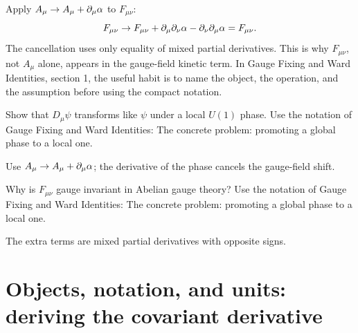 \begin{example}
Apply \(A_\mu\to A_\mu+\partial_\mu\alpha\) to \(F_{\mu\nu}\):
\[
  F_{\mu\nu}\to F_{\mu\nu}+\partial_\mu\partial_\nu\alpha-\partial_\nu\partial_\mu\alpha=F_{\mu\nu}.
\]
The cancellation uses only equality of mixed partial derivatives.  This is why \(F_{\mu\nu}\), not \(A_\mu\) alone, appears in the gauge-field kinetic term.  In Gauge Fixing and Ward Identities, section 1, the useful habit is to name the object, the operation, and the assumption before using the compact notation.
\end{example}



\begin{exercise}
Show that \(D_\mu\psi\) transforms like \(\psi\) under a local \(U(1)\) phase.  Use the notation of Gauge Fixing and Ward Identities: The concrete problem: promoting a global phase to a local one.
\begin{answer}
Use \(A_\mu\to A_\mu+\partial_\mu\alpha\); the derivative of the phase cancels the gauge-field shift.
\end{answer}
\end{exercise}

\begin{exercise}
Why is \(F_{\mu\nu}\) gauge invariant in Abelian gauge theory?  Use the notation of Gauge Fixing and Ward Identities: The concrete problem: promoting a global phase to a local one.
\begin{answer}
The extra terms are mixed partial derivatives with opposite signs.
\end{answer}
\end{exercise}



\section{Objects, notation, and units: deriving the covariant derivative}













